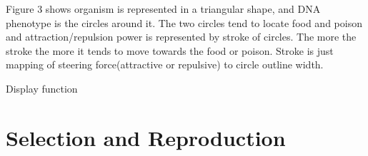 \documentclass[conference]{IEEEtran}
\begin{document}
Figure 3 shows organism is represented in a triangular shape, and DNA phenotype is the circles around it. The two circles tend to locate food and poison and attraction/repulsion power is represented by stroke of circles. The more the stroke the more it tends to move towards the food or poison. Stroke is just mapping of steering force(attractive or repulsive) to circle outline width.

\begin{algorithm}
\caption{Display function}
\begin{algorithmic} 
\end{algorithmic}
\end{algorithm}

\section{Selection and Reproduction}
\end{document}

